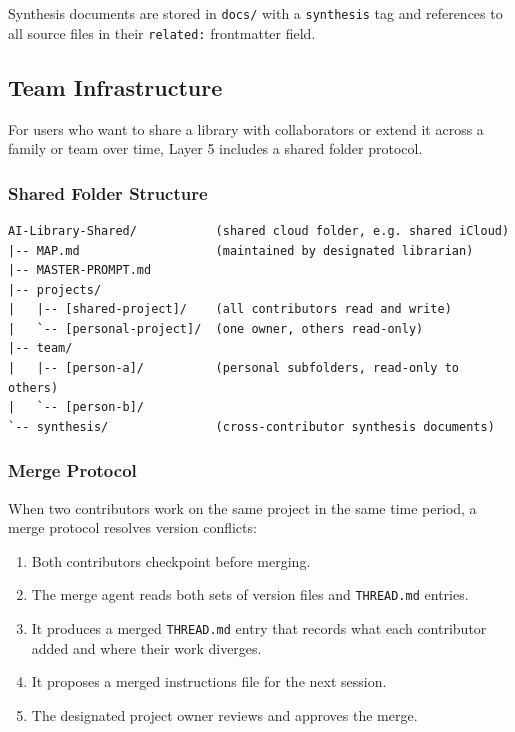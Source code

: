 \documentclass[12pt,letterpaper]{article}
\begin{document}
Synthesis documents are stored in \texttt{docs/} with a
\texttt{synthesis} tag and references to all source files
in their \texttt{related:} frontmatter field.

\subsection{Team Infrastructure}

For users who want to share a library with collaborators or extend it
across a family or team over time, Layer 5 includes a shared folder
protocol.

\subsubsection{Shared Folder Structure}

\begin{lstlisting}
AI-Library-Shared/           (shared cloud folder, e.g. shared iCloud)
|-- MAP.md                   (maintained by designated librarian)
|-- MASTER-PROMPT.md
|-- projects/
|   |-- [shared-project]/    (all contributors read and write)
|   `-- [personal-project]/  (one owner, others read-only)
|-- team/
|   |-- [person-a]/          (personal subfolders, read-only to others)
|   `-- [person-b]/
`-- synthesis/               (cross-contributor synthesis documents)
\end{lstlisting}

\subsubsection{Merge Protocol}

When two contributors work on the same project in the same time period,
a merge protocol resolves version conflicts:

\begin{enumerate}
  \item Both contributors checkpoint before merging.
  \item The merge agent reads both sets of version files and
        \texttt{THREAD.md} entries.
  \item It produces a merged \texttt{THREAD.md} entry that records
        what each contributor added and where their work diverges.
  \item It proposes a merged instructions file for the next session.
  \item The designated project owner reviews and approves the merge.
\end{enumerate}
\end{document}
